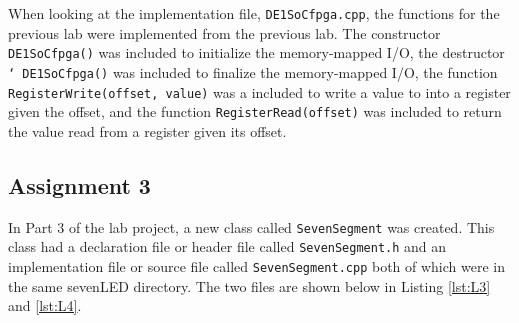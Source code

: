 \documentclass[
	letterpaper, %
	10pt, %
]{CSUniSchoolLabReport}
\begin{document}




  When looking at the implementation file, \texttt{DE1SoCfpga.cpp}, the functions for the previous lab were implemented from the previous lab. The constructor \texttt{DE1SoCfpga()} was included to initialize the memory-mapped I/O, the destructor \texttt{\char`~DE1SoCfpga()} was included to finalize the memory-mapped I/O, the function \texttt{RegisterWrite(offset, value)} was a included to write a value to into a register given the offset, and the function \texttt{RegisterRead(offset)} was included to return the value read from a register given its offset.

\subsection{Assignment 3}

In Part 3 of the lab project, a new class called \texttt{SevenSegment} was created. This class had a declaration file or header file called \texttt{SevenSegment.h} and an implementation file or source file called \texttt{SevenSegment.cpp} both of which were in the same sevenLED directory. The two files are shown below in Listing \ref{lst:L3} and \ref{lst:L4}.
\end{document}
